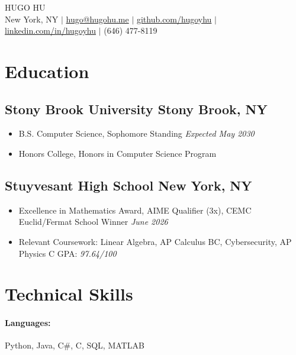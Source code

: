 \documentclass[10pt]{article}
\begin{document}
\begin{center}
    {\fontsize{18}{18}\selectfont\interthin HUGO \interheavy HU} \\ \bigskip
    New York, NY $|$
    \href{mailto:hugo@hugohu.me}{hugo@hugohu.me} $|$ 
    \href{https://github.com/Hugoyhu}{github.com/hugoyhu} $|$
    \href{https://www.linkedin.com/in/hugoyhu}{linkedin.com/in/hugoyhu} $|$
    (646) 477-8119
\end{center}

\section{Education}
\subsection{Stony Brook University \hfill Stony Brook, NY}
\begin{itemize}
    \item B.S. Computer Science, Sophomore Standing \hfill \textit{Expected May 2030}
    \item Honors College, Honors in Computer Science Program
\end{itemize}
\subsection{Stuyvesant High School \hfill New York, NY}
\begin{itemize}
    \item Excellence in Mathematics Award, AIME Qualifier (3x), CEMC Euclid/Fermat School Winner \hfill \textit{June 2026}
    \item Relevant Coursework: Linear Algebra, AP Calculus BC, Cybersecurity, AP Physics C \hfill GPA: \textit{97.64/100}
\end{itemize}

\section{Technical Skills}
\vspace{-0.6\baselineskip}
\paragraph{Languages:} Python, Java, C\#, C, SQL, MATLAB\\
\vspace{-2.1\baselineskip}
\end{document}
